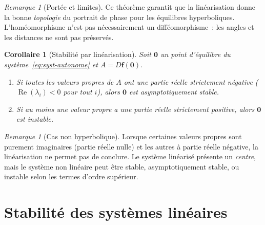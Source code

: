 \documentclass[12pt,a4paper,openany]{book}
\theoremstyle{definition}
\theoremstyle{plain}
\newtheorem{corollaire}[definition]{Corollaire}
\theoremstyle{remark}
\newtheorem{remarque}[definition]{Remarque}
\begin{document}
\begin{remarque}[Portée et limites]\label{rem:hartman-limites}
  Ce théorème garantit que la linéarisation donne la bonne
  \emph{topologie} du portrait de phase pour les équilibres
  hyperboliques. L'homéomorphisme n'est pas nécessairement un
  difféomorphisme~: les angles et les distances ne sont pas préservés.
\end{remarque}

\begin{corollaire}[Stabilité par linéarisation]\label{cor:stab-linearisation}
  Soit $\mathbf{0}$ un point d'équilibre du
  système~\eqref{eq:syst-autonome} et $A=D\mathbf{f}(\mathbf{0})$.
  \begin{enumerate}[label=(\roman*)]
    \item Si toutes les valeurs propres de $A$ ont une partie réelle
      strictement négative ($\operatorname{Re}(\lambda_i)<0$ pour
      tout $i$), alors $\mathbf{0}$ est \emph{asymptotiquement stable}.
    \item Si au moins une valeur propre a une partie réelle
      strictement positive, alors $\mathbf{0}$ est \emph{instable}.
  \end{enumerate}
\end{corollaire}

\begin{remarque}[Cas non hyperbolique]\label{rem:cas-centre}
  Lorsque certaines valeurs propres sont purement imaginaires
  (partie réelle nulle) et les autres à partie réelle négative, la
  linéarisation ne permet pas de conclure. Le système linéarisé
  présente un \emph{centre}, mais le système non linéaire peut être
  stable, asymptotiquement stable, ou instable selon les termes
  d'ordre supérieur.
\end{remarque}

\section{Stabilité des systèmes linéaires}\label{sec:stab-lineaire}
\end{document}
